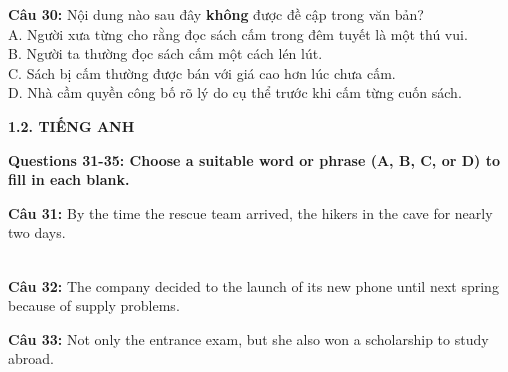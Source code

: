 \documentclass[12pt,a4paper]{article}
\begin{document}
\noindent \textbf{Câu 30:} Nội dung nào sau đây \textbf{không} được đề cập trong văn bản?\\
\noindent A. Người xưa từng cho rằng đọc sách cấm trong đêm tuyết là một thú vui.\\
\noindent B. Người ta thường đọc sách cấm một cách lén lút.\\
\noindent C. Sách bị cấm thường được bán với giá cao hơn lúc chưa cấm.\\
\noindent D. Nhà cầm quyền công bố rõ lý do cụ thể trước khi cấm từng cuốn sách.


\vspace{0.5cm}
\textbf{1.2. TIẾNG ANH} \textit{}

\par\nobreak

\noindent\textbf{Questions 31-35: Choose a suitable word or phrase (A, B, C, or D) to fill in each blank.}%


\par\nobreak


\noindent \textbf{Câu 31:} By the time the rescue team arrived, the hikers \underline{\hspace{1.5cm}} in the cave for nearly two days.\\
\noindent{}\\
\noindent{}




\noindent \textbf{Câu 32:} The company decided to \underline{\hspace{1.5cm}} the launch of its new phone until next spring because of supply problems.\\
\noindent{}




\noindent \textbf{Câu 33:} Not only \underline{\hspace{1.5cm}} the entrance exam, but she also won a scholarship to study abroad.\\
\noindent{}
\end{document}
